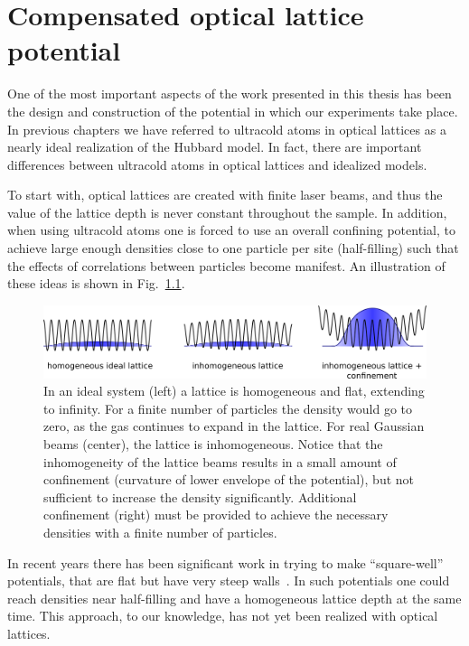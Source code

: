 \chapter{Compensated optical lattice potential}
\label{chap:compensated-optical-lattice}


One of the most important aspects of the work presented in this thesis has been
the design and construction of the potential in which our experiments take
place.   In previous chapters we have referred to ultracold atoms in optical
lattices as a nearly ideal realization of the Hubbard model.   In fact, there
are important differences between ultracold atoms in optical lattices and
idealized models.    

To start with, optical lattices are created with finite laser beams, and thus
the value of the lattice depth is never constant throughout the sample.      In
addition, when using ultracold atoms one is forced to use an overall confining
potential, to achieve large enough densities close to one particle per site
(half-filling) such that the effects of correlations between particles become
manifest.  An illustration of these ideas is shown in
Fig.~\ref{fig:comp-uncomp}. 
\begin{figure}
    \centering
\includegraphics[width=\textwidth]{../illustrations/lattice/comp+uncomp-inhom.png}
\caption{\small In an ideal system (left) a lattice is homogeneous and flat,
extending to infinity.  For a finite number of particles the density would go
to zero, as the gas continues to expand in the lattice.   For real Gaussian
beams (center), the lattice is inhomogeneous.  Notice that the inhomogeneity of
the lattice beams results in a small amount of confinement (curvature of lower
envelope of the potential), but not sufficient to increase the density
significantly.   Additional confinement (right) must be provided to achieve the
necessary densities with a finite number of particles.  } 
\label{fig:comp-uncomp}
\end{figure}
In recent years there has been significant work in trying to make
``square-well'' potentials, that are flat but have very steep
walls~\cite{liang20091,PhysRevLett.110.200406}.  In such potentials one could
reach densities near half-filling and have a homogeneous lattice depth at the
same time.  This approach, to our knowledge, has not yet been realized with
optical lattices.

